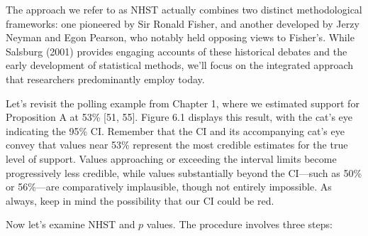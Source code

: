 \documentclass[
  letterpaper,
  DIV=11,
  numbers=noendperiod]{scrreprt}
\begin{document}
The approach we refer to as NHST actually combines two distinct
methodological frameworks: one pioneered by Sir Ronald Fisher, and
another developed by Jerzy Neyman and Egon Pearson, who notably held
opposing views to Fisher's. While Salsburg (2001) provides engaging
accounts of these historical debates and the early development of
statistical methods, we'll focus on the integrated approach that
researchers predominantly employ today.

Let's revisit the polling example from Chapter 1, where we estimated
support for Proposition A at 53\% {[}51, 55{]}. Figure 6.1 displays this
result, with the cat's eye indicating the 95\% CI. Remember that the CI
and its accompanying cat's eye convey that values near 53\% represent
the most credible estimates for the true level of support. Values
approaching or exceeding the interval limits become progressively less
credible, while values substantially beyond the CI---such as 50\% or
56\%---are comparatively implausible, though not entirely impossible. As
always, keep in mind the possibility that our CI could be red.

Now let's examine NHST and \(p\) values. The procedure involves three
steps:
\end{document}
